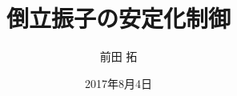 \documentclass[a4j,11pt,twoside]{jbook}
\begin{document}
\title{倒立振子の安定化制御}
\author{前田 拓}
\date{2017年8月4日}
\maketitle

\tableofcontents
\listoffigures
\listoftables
{}






 



 

 

\end{document}
